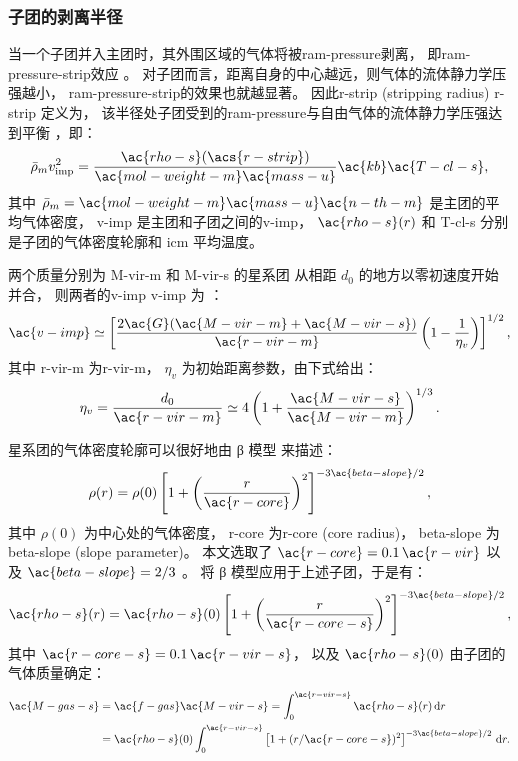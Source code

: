 \subsubsection{子团的剥离半径}

当一个子团并入主团时，其外围区域的气体将被\ac{ram-pressure}剥离，
即\acf{ram-pressure-strip}效应 \cite{gunn1972}。
对子团而言，距离自身的中心越远，则气体的流体静力学压强越小，
\ac{ram-pressure-strip}的效果也就越显著。
因此\acl{r-strip} (stripping radius) \ac{r-strip} 定义为，
该半径处子团受到的\ac{ram-pressure}与自由气体的流体静力学压强达到平衡
\cite{cassano2005}，即：
\begin{equation}
  \label{eq:rs-eqp}
  \bar{\rho}_m v_{\R{imp}}^2
    = \frac{\ac{rho-s}(\acs{r-strip})}{\ac{mol-weight-m} \ac{mass-u}}
      \ac{kb} \ac{T-cl-s} ,
\end{equation}
其中
$\bar{\rho}_m = \ac{mol-weight-m} \ac{mass-u} \ac{n-th-m}$
是主团的平均气体密度，
\ac{v-imp} 是主团和子团之间的\acl{v-imp}，
$\ac{rho-s}(r)$ 和 \ac{T-cl-s} 分别是子团的气体密度轮廓和 \ac{icm} 平均温度。

两个质量分别为 \ac{M-vir-m} 和 \ac{M-vir-s} 的星系团
从相距 $d_0$ 的地方以零初速度开始并合，
则两者的\acl{v-imp} \ac{v-imp} 为 \cite{sarazin2002,cassano2005}：
\begin{equation}
  \label{eq:v-imp}
  \ac{v-imp} \simeq \left[
    \frac{2 \ac{G} (\ac{M-vir-m} + \ac{M-vir-s})}{\ac{r-vir-m}}
    \left( 1 - \frac{1}{\eta_v} \right)\right]^{1/2} ,
\end{equation}
其中
\ac{r-vir-m} 为\acl{r-vir-m}，
$\eta_v$ 为初始距离参数，由下式给出：
\begin{equation}
  \eta_v
    = \frac{d_0}{\ac{r-vir-m}}
    \simeq 4 \left( 1 + \frac{\ac{M-vir-s}}{\ac{M-vir-m}} \right)^{1/3} .
\end{equation}

星系团的气体密度轮廓可以很好地由 β 模型 \cite{cavaliere1976} 来描述：
\begin{equation}
  \label{eq:beta-model}
  \rho(r)
    = \rho(0) \left[ 1 + \left(
      \frac{r}{\ac{r-core}} \right)^2 \right]^{-3\ac{beta-slope}/2} ,
\end{equation}
其中
$\rho(0)$ 为中心处的气体密度，
\ac{r-core} 为\acl{r-core} (core radius)，
\ac{beta-slope} 为\acl{beta-slope} (slope parameter)。
本文选取了 $\ac{r-core} = 0.1 \,\ac{r-vir}$ \cite{sanderson2003}
以及 $\ac{beta-slope} = 2/3$ \cite{jones1984}。
将 β 模型应用于上述子团，于是有：
\begin{equation}
  \ac{rho-s}(r)
    = \ac{rho-s}(0) \left[ 1 + \left(
      \frac{r}{\ac{r-core-s}} \right)^2 \right]^{-3\ac{beta-slope}/2} ,
\end{equation}
其中
$\ac{r-core-s} = 0.1 \,\ac{r-vir-s}$，
以及 $\ac{rho-s}(0)$ 由子团的气体质量确定：
\begin{align}
  \ac{M-gas-s}
    & = \ac{f-gas} \ac{M-vir-s}
      = \int_0^{\ac{r-vir-s}} \ac{rho-s}(r) \,\D{r}  \\
    & = \ac{rho-s}(0) \int_0^{\ac{r-vir-s}}
        \left[ 1 + (r / \ac{r-core-s})^2 \right]^{-3\ac{beta-slope}/2}
        \,\D{r} .
\end{align}


